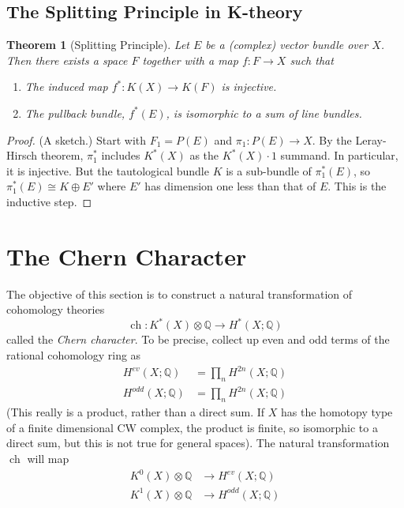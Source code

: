 \documentclass[a4paper,10pt]{article}
\theoremstyle{plain}%
\newtheorem{thm}{Theorem}
\theoremstyle{definition}
\theoremstyle{remark}
\newcommand{\QQ}{\mathbb{Q}}
\DeclareMathOperator{\ch}{ch}
\begin{document}
\subsection{The Splitting Principle in K-theory}

\begin{thm}[Splitting Principle]
  Let $E$ be a (complex) vector bundle over $X$. Then there exists a
  space $F$ together with a map $f: F\to X$ such that
  \begin{enumerate}
  \item The induced map $f^*: K(X) \to K(F)$ is injective.
  \item The pullback bundle, $f^*(E)$, is isomorphic to a sum of line
    bundles.
  \end{enumerate}
\end{thm}
\begin{proof}
  (A sketch.) Start with $F_1 = P(E)$ and $\pi_1: P(E)\to X$. By the
  Leray-Hirsch theorem, $\pi_1^*$ includes $K^*(X)$ as the
  $K^*(X)\cdot 1$ summand. In particular, it is injective. But the
  tautological bundle $K$ is a sub-bundle of $\pi_1^*(E)$, so
  $\pi_1^*(E) \cong K\oplus E'$ where $E'$ has dimension one less than
  that of $E$. This is the inductive step.
\end{proof}

\section{The Chern Character}

The objective of this section is to construct a natural transformation
of cohomology theories
\begin{equation*}
  \ch: K^*(X)\otimes \QQ \to H^*(X; \QQ)
\end{equation*}
called the \emph{Chern character}. To be precise, collect up even and
odd terms of the rational cohomology ring as
\begin{align*}
  H^{ev}(X; \QQ) &= \prod_n H^{2n}(X; \QQ)\\
  H^{odd}(X; \QQ) &= \prod_n H^{2n}(X; \QQ)
\end{align*}
(This really is a product, rather than a direct sum. If $X$ has the
homotopy type of a finite dimensional CW complex, the product is
finite, so isomorphic to a direct sum, but this is not true for
general spaces). The natural transformation $\ch$ will map
\begin{align*}
  K^0(X)\otimes \QQ &\to H^{ev}(X; \QQ)\\
  K^1(X)\otimes \QQ &\to H^{odd}(X; \QQ)
\end{align*}
\end{document}
